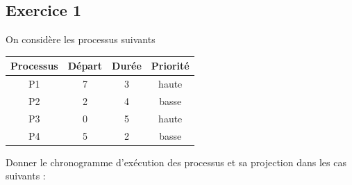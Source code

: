 \documentclass[12pt,a4paper,article,english,firamath]{nsi}
\begin{document}
\maketitle

\subsection*{Exercice 1}
On considère les processus suivants
\begin{center}
\begin{tabular}{|c|c|c|c|}
\hline\rowcolor{UGLiOrange}
\textbf{\color{white} Processus} & \textbf{\color{white}Départ} & \textbf{\color{white}Durée} & \textbf{\color{white}Priorité} \\
\hline
P1 & 7 & 3 & haute \\
\hline
P2 & 2 & 4 & basse \\
\hline
P3 & 0 & 5 & haute \\
\hline
P4 & 5 & 2 & basse \\
\hline
\end{tabular}
\end{center}
Donner le chronogramme d'exécution des processus et sa projection dans les cas suivants :
\end{document}
